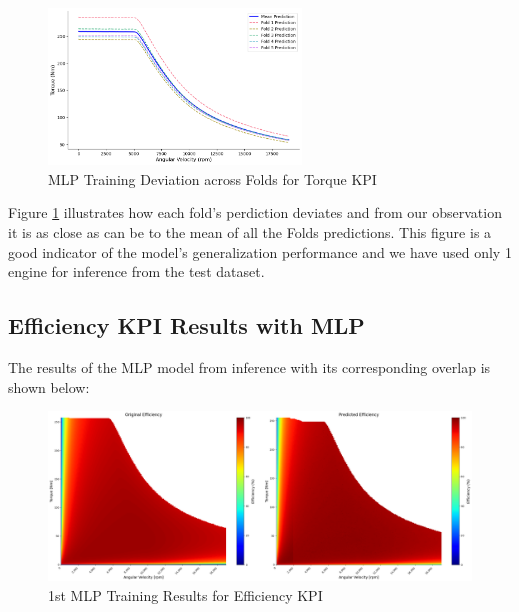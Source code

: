 \documentclass{report} %
\begin{document}
\begin{figure}[H]
    \centering
    \includegraphics[width=0.6\textwidth]{./ReportImages/folds_dev_y1.png} 
    \caption{MLP Training Deviation across Folds for Torque \ac{KPI}} 
    \label{fig:MLP Training Deviation across Folds for Torque KPI}
\end{figure}

Figure \ref{fig:MLP Training Deviation across Folds for Torque KPI} illustrates how each fold's perdiction deviates and from our observation it is as close as can be to the mean of all the Folds predictions.
This figure is a good indicator of the model's generalization performance and we have used only 1 engine for inference from the test dataset.


\subsection{Efficiency \ac{KPI} Results with \ac{MLP}}\label{sec:3D Efficiency Grid Results with MLP}

The results of the \ac{MLP} model from inference with its corresponding overlap is shown below: \\

\begin{figure}[H]
    \centering
    \includegraphics[width=1\textwidth]{./ReportImages/KPI3Dprediction1.png} 
    \caption{1st MLP Training Results for Efficiency \ac{KPI}} 
    \label{fig:1st MLP Training Results for 3D KPI(Efficiency)}
\end{figure}
\end{document}
